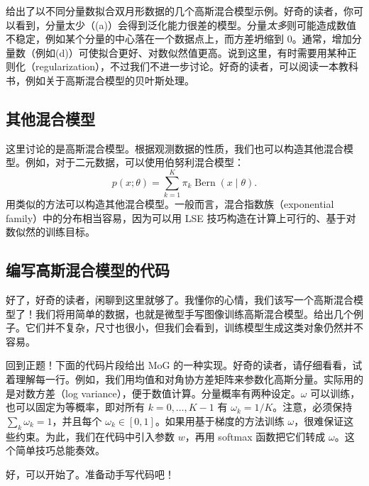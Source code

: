 给出了以不同分量数拟合双月形数据的几个高斯混合模型示例。好奇的读者，你可以看到，分量太少（(a)）会得到泛化能力很差的模型。分量\emph{太多}则可能造成数值不稳定，例如某个分量的中心落在一个数据点上，而方差坍缩到 0。通常，增加分量数（例如(d)）可使拟合更好、对数似然值更高。说到这里，有时需要用某种正则化（regularization），不过我们不进一步讨论。好奇的读者，可以阅读一本教科书，例如关于高斯混合模型的贝叶斯处理。

\subsection{其他混合模型}
这里讨论的是高斯混合模型。根据观测数据的性质，我们也可以构造其他混合模型。例如，对于二元数据，可以使用伯努利混合模型：
\begin{equation}
p(x;\theta)=\sum_{k=1}^{K}\pi_k\operatorname{Bern}(x\mid\theta).
\tag{2.38}\label{eq:02-38}
\end{equation}
用类似的方法可以构造其他混合模型。一般而言，混合指数族（exponential family）中的分布相当容易，因为可以用 LSE 技巧构造在计算上可行的、基于对数似然的训练目标。


\subsection{编写高斯混合模型的代码}
好了，好奇的读者，闲聊到这里就够了。我懂你的心情，我们该写一个高斯混合模型了！我们将用简单的数据，也就是微型手写图像训练高斯混合模型。给出几个例子。它们并不复杂，尺寸也很小，但我们会看到，训练模型生成这类对象仍然并不容易。

回到正题！下面的代码片段给出 MoG 的一种实现。好奇的读者，请仔细看看，试着理解每一行。例如，我们用均值和对角协方差矩阵来参数化高斯分量。实际用的是对数方差（log variance），便于数值计算。分量概率有两种设定。$\omega$ 可以训练，也可以固定为等概率，即对所有 $k=0,\ldots,K-1$ 有 $\omega_k=1/K$。注意，必须保持 $\sum_k\omega_k=1$，并且每个 $\omega_k\in[0,1]$。如果用基于梯度的方法训练 $\omega$，很难保证这些约束。为此，我们在代码中引入参数 $w$，再用 softmax 函数把它们转成 $\omega$。这个简单技巧总能奏效。

好，可以开始了。准备动手写代码吧！

